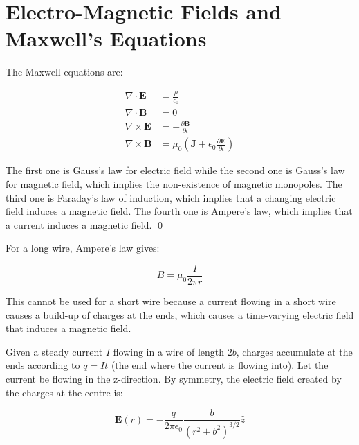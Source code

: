 \documentclass[12pt]{article}
\begin{document}
\pagebreak
\section*{Electro-Magnetic Fields and Maxwell's Equations}


The Maxwell equations are:

\begin{equation}
\begin{split}
    \nabla \cdot \mathbf{E} &= \frac{\rho}{\epsilon_{0}} \\
    \nabla \cdot \mathbf{B} &= 0 \\
    \nabla \times \mathbf{E} &= -\frac{\partial \mathbf{B}}{\partial t} \\
    \nabla \times \mathbf{B} &= \mu_{0} \left( \mathbf{J} + \epsilon_{0} \frac{\partial \mathbf{E}}{\partial t} \right)
\end{split}
\end{equation}

The first one is Gauss's law for electric field while the second one is Gauss's law for magnetic field, which implies the non-existence of magnetic monopoles. The third one is Faraday's law of induction, which implies that a changing electric field induces a magnetic field. The fourth one is Ampere's law, which implies that a current induces a magnetic field.
\qed



For a long wire, Ampere's law gives:

\begin{equation}
    B = \mu_{0} \frac{I}{2\pi r}
\end{equation}

This cannot be used for a short wire because a current flowing in a short wire causes a build-up of charges at the ends, which causes a time-varying electric field that induces a magnetic field.

Given a steady current $I$ flowing in a wire of length $2b$, charges accumulate at the ends according to $q = It$ (the end where the current is flowing into). Let the current be flowing in the z-direction. By symmetry, the electric field created by the charges at the centre is:

\begin{equation}
    \mathbf{E}(r) = -\frac{q}{2\pi \epsilon_{0}} \frac{b}{(r^{2} + b^{2})^{3/2}} \hat{z}
\end{equation}
\end{document}
